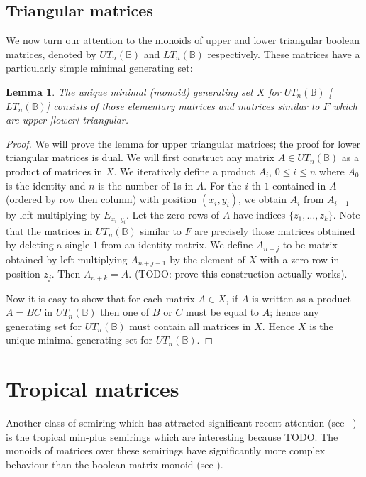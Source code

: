 \documentclass[11pt]{article}
\newtheorem{lemma}[thm]{Lemma}
\numberwithin{equation}{section}
\newcommand{\B}{\mathbb{B}}
\newcommand{\UTn}{UT_n(\B)}
\newcommand{\LTn}{LT_n(\B)}
\begin{document}
\subsection{Triangular matrices}
We now turn our attention to the monoids of upper and lower triangular boolean
matrices, denoted by $\UTn$ and $\LTn$ respectively. These matrices have a
particularly simple minimal generating set:

\begin{lemma}
  The unique minimal (monoid) generating set $X$ for $\UTn$ [$\LTn$] consists of
  those elementary matrices and matrices similar to $F$ which are upper [lower]
  triangular.
\end{lemma}

\begin{proof}
  We will prove the lemma for upper triangular matrices; the proof for lower
  triangular matrices is dual.
  We will first construct any matrix $A \in \UTn$ as a product of matrices in
  $X$. We iteratively define a product $A_i$, $0 \leq i \leq n$ where $A_0$ is
  the identity and $n$ is the number of $1$s in $A$. For the $i$-th $1$
  contained in $A$ (ordered by row then column) with position $(x_i, y_i)$, we
  obtain $A_i$ from $A_{i - 1}$ by left-multiplying by $E_{x_i, y_i}$. Let the
  zero rows of $A$ have indices $\{z_1, \ldots, z_{k}\}$. Note that the matrices
  in $\UTn$ similar to $F$ are precisely those matrices obtained by deleting a
  single $1$ from an identity matrix. We define $A_{n + j}$ to be matrix
  obtained by left multiplying $A_{n + j - 1}$ by the element of $X$ with a zero
  row in position $z_j$. Then $A_{n + k} = A$. (TODO: prove this construction
  actually works).
  
  
  Now it is easy to show that for each matrix $A \in X$, if $A$ is written as a
  product $A = BC$ in $\UTn$ then one of $B$ or $C$ must be equal to $A$; hence
  any generating set for $\UTn$ must contain all matrices in $X$. Hence $X$ is
  the unique minimal generating set for $\UTn$.
\end{proof}

\section{Tropical matrices}
Another class of semiring which has attracted significant recent attention (see
~\cite{TODO}) is the tropical min-plus semirings which are interesting because
TODO. The monoids of matrices over these semirings have significantly more
complex behaviour than the boolean matrix monoid (see \cite{TODO}).
\end{document}
